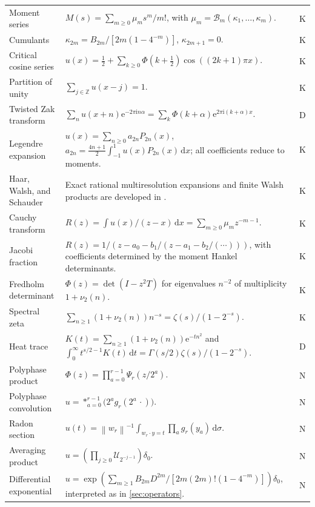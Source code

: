 \documentclass[11pt,oneside]{article}
\numberwithin{equation}{section}
\theoremstyle{definition}
\theoremstyle{remark}
\newcommand{\Z}{\mathbb Z}
\newcommand{\dd}{\,\mathrm d}
\newcommand{\e}{\mathrm e}
\newcommand{\ii}{\mathrm i}
\newcommand{\norm}[1]{\left\lVert#1\right\rVert}
\newcommand{\cU}{\mathcal U}
\newcommand{\cB}{\mathcal B}
\newcommand{\statusknown}{\textcolor{deepviolet}{\textsf{K}}}
\newcommand{\statusderived}{\textcolor{derivedblue}{\textsf{D}}}
\newcommand{\statusnew}{\textcolor{provedgreen}{\textsf{N}}}
\begin{document}
\begin{longtable}{@{}p{}p{}p{}@{}}
Moment series &
$M(s)=\sum_{m\ge0}\mu_ms^m/m!$, with
$\mu_m=\cB_m(\kappa_1,\ldots,\kappa_m)$. & \statusknown\\
Cumulants &
$\kappa_{2m}=B_{2m}/[2m(1-4^{-m})]$, $\kappa_{2m+1}=0$. & \statusknown\\
Critical cosine series &
$u(x)=\tfrac12+\sum_{k\ge0}\Phi(k+\tfrac12)\cos((2k+1)\pi x)$. & \statusknown\\
Partition of unity &
$\sum_{j\in\Z}u(x-j)=1$. & \statusknown\\
Twisted Zak transform &
$\sum_nu(x+n)\e^{-2\pi\ii n\alpha}
=\sum_k\Phi(k+\alpha)\e^{2\pi\ii(k+\alpha)x}$. & \statusderived\\
Legendre expansion &
$u(x)=\sum_{n\ge0}a_{2n}P_{2n}(x)$,
$a_{2n}=\frac{4n+1}{2}\int_{-1}^{1}u(x)P_{2n}(x)\dd x$;
all coefficients reduce to moments. & \statusknown\\
Haar, Walsh, and Schauder &
Exact rational multiresolution expansions and finite Walsh products are developed in \cite{repoMultiresolution}. & \statusknown\\
Cauchy transform &
$R(z)=\int u(x)/(z-x)\dd x=\sum_{m\ge0}\mu_mz^{-m-1}$. & \statusknown\\
Jacobi fraction &
$R(z)=1/(z-a_0-b_1/(z-a_1-b_2/(\cdots)))$, with coefficients determined by the moment Hankel determinants. & \statusknown\\
Fredholm determinant &
$\Phi(z)=\det(I-z^2T)$ for eigenvalues $n^{-2}$ of multiplicity $1+\nu_2(n)$. & \statusknown\\
Spectral zeta &
$\sum_{n\ge1}(1+\nu_2(n))n^{-s}=\zeta(s)/(1-2^{-s})$. & \statusknown\\
Heat trace &
$K(t)=\sum_{n\ge1}(1+\nu_2(n))\e^{-tn^2}$ and
$\int_0^\infty t^{s/2-1}K(t)\dd t=\Gamma(s/2)\zeta(s)/(1-2^{-s})$. & \statusderived\\
Polyphase product &
$\Phi(z)=\prod_{a=0}^{r-1}\Psi_r(z/2^a)$. & \statusnew\\
Polyphase convolution &
$u=*_{a=0}^{r-1}\bigl(2^ag_r(2^a\,\cdot)\bigr)$. & \statusnew\\
Radon section &
$u(t)=\norm{w_r}^{-1}\int_{w_r\cdot y=t}\prod_ag_r(y_a)\dd\sigma$. & \statusnew\\
Averaging product &
$u=(\prod_{j\ge0}\cU_{2^{-j-1}})\delta_0$. & \statusnew\\
Differential exponential &
$u=\exp(\sum_{m\ge1}B_{2m}D^{2m}/[2m(2m)!(1-4^{-m})])\delta_0$, interpreted as in \cref{sec:operators}. & \statusnew\\
\bottomrule
\end{longtable}
\end{document}
